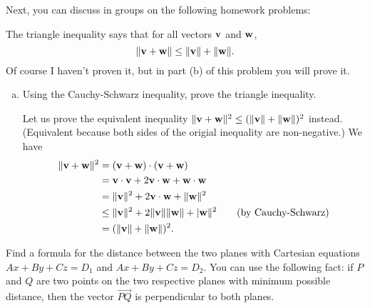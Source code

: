 \documentclass[11pt,oneside]{amsart}
\theoremstyle{definition}
\begin{document}
Next, you can discuss in groups on the following homework problems:
\begin{problem}
  The triangle inequality says that for all vectors $\mathbf v$ and $\mathbf w$,
  \[\|\mathbf v+\mathbf w\|\leq \|\mathbf v\|+\|\mathbf w\|.\]
  Of course I haven't proven it, but in part (b) of this problem you will prove it.
    \begin{enumerate}[(b)]
    
      
      \item Using the Cauchy-Schwarz inequality, prove the triangle inequality.
      \begin{solution}
        Let us prove the equivalent inequality $\|\mathbf v+\mathbf w\|^2\leq(\|\mathbf v\|+\|\mathbf w\|)^2$ instead. (Equivalent because both sides of the origial inequality are non-negative.) We have
        \[\begin{split}
          \|\mathbf v+\mathbf w\|^2 &= (\mathbf v+\mathbf w)\cdot(\mathbf v+\mathbf w)\\
          &= \mathbf v\cdot\mathbf v+2\mathbf v\cdot\mathbf w+\mathbf w\cdot\mathbf w\\
          &= \|\mathbf v\|^2+2\mathbf v\cdot\mathbf w+\|\mathbf w\|^2\\
          &\leq\|\mathbf v\|^2+2\|\mathbf v\|\|\mathbf w\|+|\mathbf w\|^2\qquad\text{(by Cauchy-Schwarz)} \\
          &=(\|\mathbf v\|+\|\mathbf w\|)^2.
        \end{split}\]
     
      \end{solution}
  \end{enumerate}
\end{problem}
\begin{problem}
  Find a formula for the distance between the two planes with Cartesian equations $Ax+By+Cz=D_1$ and $Ax+By+Cz=D_2$. You can use the following fact: if $P$ and $Q$ are two points on the two respective planes with minimum possible distance, then the vector $\overrightarrow{PQ}$ is perpendicular to both planes.

\end{problem}
\end{document}
